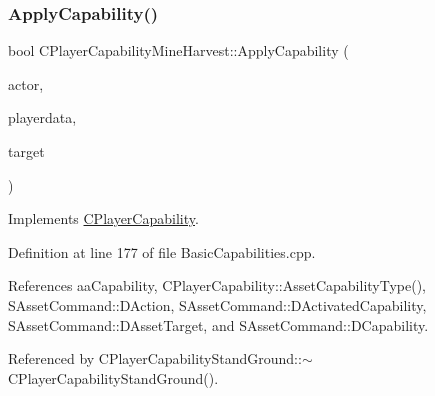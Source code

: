 \subsubsection{\texorpdfstring{Apply\+Capability()}{ApplyCapability()}}
{\footnotesize\ttfamily bool C\+Player\+Capability\+Mine\+Harvest\+::\+Apply\+Capability (\begin{DoxyParamCaption}\item[{std\+::shared\+\_\+ptr$<$ \hyperlink{classCPlayerAsset}{C\+Player\+Asset} $>$}]{actor,  }\item[{std\+::shared\+\_\+ptr$<$ \hyperlink{classCPlayerData}{C\+Player\+Data} $>$}]{playerdata,  }\item[{std\+::shared\+\_\+ptr$<$ \hyperlink{classCPlayerAsset}{C\+Player\+Asset} $>$}]{target }\end{DoxyParamCaption})\hspace{0.3cm}{\ttfamily [virtual]}}



Implements \hyperlink{classCPlayerCapability_a2ca6fd7fbd9c0178f1cf1d049c63825f}{C\+Player\+Capability}.



Definition at line 177 of file Basic\+Capabilities.\+cpp.



References aa\+Capability, C\+Player\+Capability\+::\+Asset\+Capability\+Type(), S\+Asset\+Command\+::\+D\+Action, S\+Asset\+Command\+::\+D\+Activated\+Capability, S\+Asset\+Command\+::\+D\+Asset\+Target, and S\+Asset\+Command\+::\+D\+Capability.



Referenced by C\+Player\+Capability\+Stand\+Ground\+::$\sim$\+C\+Player\+Capability\+Stand\+Ground().


